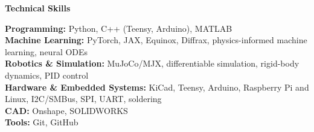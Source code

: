 \begin{center}
    \textbf{Technical Skills}
\end{center}

\textbf{Programming:} Python, C++ (Teensy, Arduino), MATLAB\\
\textbf{Machine Learning:} PyTorch, JAX, Equinox, Diffrax, physics-informed machine learning, neural ODEs\\
\textbf{Robotics \& Simulation:} MuJoCo/MJX, differentiable simulation, rigid-body dynamics, PID control\\
\textbf{Hardware \& Embedded Systems:} KiCad, Teensy, Arduino, Raspberry Pi and Linux, I2C/SMBus, SPI, UART, soldering\\
\textbf{CAD:} Onshape, SOLIDWORKS\\
\textbf{Tools:} Git, GitHub
